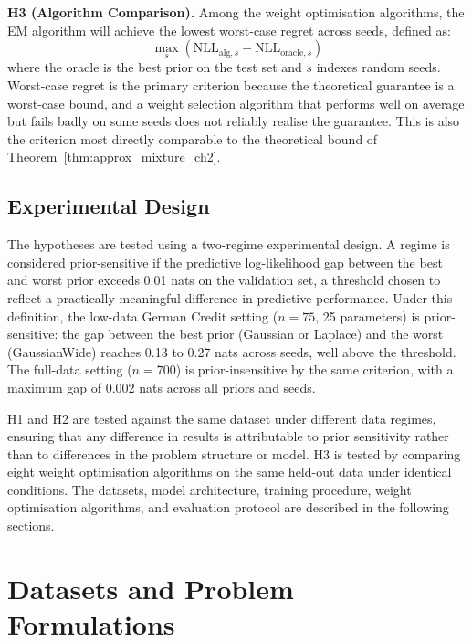 \textbf{H3 (Algorithm Comparison).} Among 
the weight optimisation algorithms, the EM 
algorithm will achieve the lowest worst-case 
regret across seeds, defined as:
\begin{equation}
    \max_s \left(\mathrm{NLL}_{\mathrm{alg},s} 
    - \mathrm{NLL}_{\mathrm{oracle},s}\right)
\end{equation}
where the oracle is the best prior on the 
test set and $s$ indexes random seeds. 
Worst-case regret is the primary criterion 
because the theoretical guarantee is a 
worst-case bound, and a weight selection 
algorithm that performs well on average 
but fails badly on some seeds does not 
reliably realise the guarantee. This is 
also the criterion most directly comparable 
to the theoretical bound of 
Theorem~\ref{thm:approx_mixture_ch2}.

\subsection{Experimental Design}

The hypotheses are tested using a two-regime 
experimental design. A regime is considered 
prior-sensitive if the predictive log-likelihood 
gap between the best and worst prior exceeds 
0.01 nats on the validation set, a threshold 
chosen to reflect a practically meaningful 
difference in predictive performance. Under 
this definition, the low-data German Credit 
setting ($n = 75$, 25 parameters) is 
prior-sensitive: the gap between the best 
prior (Gaussian or Laplace) and the worst 
(GaussianWide) reaches 0.13 to 0.27 nats 
across seeds, well above the threshold. The 
full-data setting ($n = 700$) is 
prior-insensitive by the same criterion, 
with a maximum gap of 0.002 nats across all 
priors and seeds.

H1 and H2 are tested against the same 
dataset under different data regimes, 
ensuring that any difference in results 
is attributable to prior sensitivity 
rather than to differences in the 
problem structure or model. H3 is tested 
by comparing eight weight optimisation 
algorithms on the same held-out data 
under identical conditions. The datasets, 
model architecture, training procedure, 
weight optimisation algorithms, and 
evaluation protocol are described in the 
following sections.

\section{Datasets and Problem Formulations}

